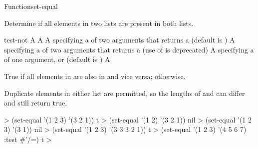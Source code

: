 \documentclass[10pt,twoside,english,pdftex]{article}
\begin{document}
\begin{functiondoc}{Function}{set-equal}{%
    }

\fnsyntax

\fnpurpose Determine if all elements in two lists are present in both lists.

\fnpackage {}

\fnmodule {}

\fnargs
\begin{args}{test-not}
\arg[list-1] A 
\arg[list-2] A 
\arg[test] A  specifying a 
of two arguments that returns a  (default is
)
 A  specifying a
 of two arguments that returns a
 (use of  is deprecated)
\arg[key] A  specifying a 
of one argument, or \nil{} (default is \nil)
\arg[boolean] A 
\end{args}

\fnreturns True if all elements in  are also in
 and vice versa; \nil{} otherwise.

\fndescription Duplicate elements in either list are permitted, so the lengths
of  and  can differ and still return
true.

\fnexamples
%
\W\supp
\begin{example}
  > (set-equal '(1 2 3) '(3 2 1))
  t
  > (set-equal '(1 2) '(3 2 1))
  nil\goodpagebreak
  > (set-equal '(1 2 3) '(3 1))
  nil
  > (set-equal '(1 2 3) '(3 3 3 2 1))
  t
  > (set-equal '(1 2 3) '(4 5 6 7) :test #'/=)
  t
  >
\end{example}

\end{functiondoc}

\end{document}
